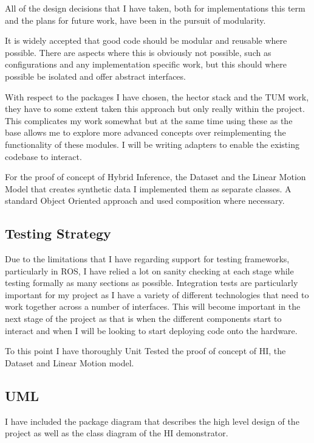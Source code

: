 \documentclass[]{../resources/final_report}
\begin{document}
All of the design decisions that I have taken, both for implementations this term and the plans 
for future work, have been in the pursuit of modularity.

It is widely accepted that good code should be modular and reusable where possible. There are 
aspects where this is obviously not possible, such as configurations and any implementation 
specific work, but this should where possible be isolated and offer abstract interfaces.

With respect to the packages I have chosen, the hector stack and the TUM work, they have to some 
extent taken this approach but only really within the project. 
This complicates my work somewhat but at the same time using these as the base allows me to explore
 more advanced concepts over reimplementing the functionality of these modules.
I will be writing adapters to enable the existing codebase to interact.

For the proof of concept of Hybrid Inference, the Dataset and the Linear Motion Model that creates 
synthetic data I implemented them as separate classes. A standard Object Oriented approach and used
composition where necessary.


\subsection{Testing Strategy}

Due to the limitations that I have regarding support for testing frameworks, particularly in ROS, 
I have relied a lot on sanity checking at each stage while testing formally as many sections as 
possible. Integration tests are particularly important for my project as I have a variety of 
different technologies that need to work together across a number of interfaces.
This will become important in the next stage of the project as that is when the different components 
start to interact and when I will be looking to start deploying code onto the hardware.

To this point I have thoroughly Unit Tested the proof of concept of HI, the 
Dataset and Linear Motion model.


\subsection{UML}
I have included the package diagram that describes the high level design 
of the project as well as the class diagram of the HI demonstrator.
\end{document}
